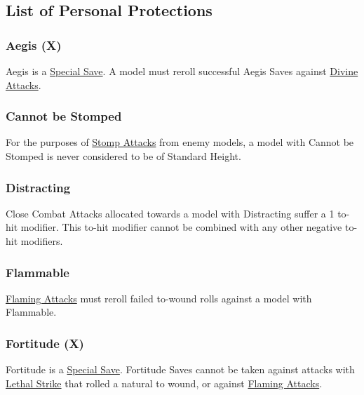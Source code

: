 \subsection{List of Personal Protections}
\label{list_of_personal_protections}

\subsubsection{Aegis (X)}
\idx[main=y]{\aegis{}}\label{aegis}

Aegis is a \hyperref[special_saves]{Special Save}. A model must reroll successful Aegis Saves against \hyperref[divine_attacks]{Divine Attacks}.

\subsubsection{Cannot be Stomped}
\idx[main=y]{\cannotbestomped}\label{cannot_be_stomped}

For the purposes of \hyperref[stomp_attacks]{Stomp Attacks} from enemy models, a model with Cannot be Stomped is never considered to be of Standard Height.

\subsubsection{Distracting}
\idx[main=y]{\distracting}\label{distracting}

Close Combat Attacks allocated towards a model with Distracting suffer a \minuss{}1 to-hit modifier. This to-hit modifier cannot be combined with any other negative to-hit modifiers.

\subsubsection{Flammable}
\idx[main=y]{\flammable}\label{flammable}

\hyperref[flaming_attacks]{Flaming Attacks} must reroll failed to-wound rolls against a model with Flammable.

\subsubsection{Fortitude (X)}
\idx[main=y]{\fortitude{}}\label{fortitude}

Fortitude is a \hyperref[special_saves]{Special Save}. Fortitude Saves cannot be taken against attacks with \hyperref[lethal_strike]{Lethal Strike} that rolled a natural  to wound, or against \hyperref[flaming_attacks]{Flaming Attacks}.

